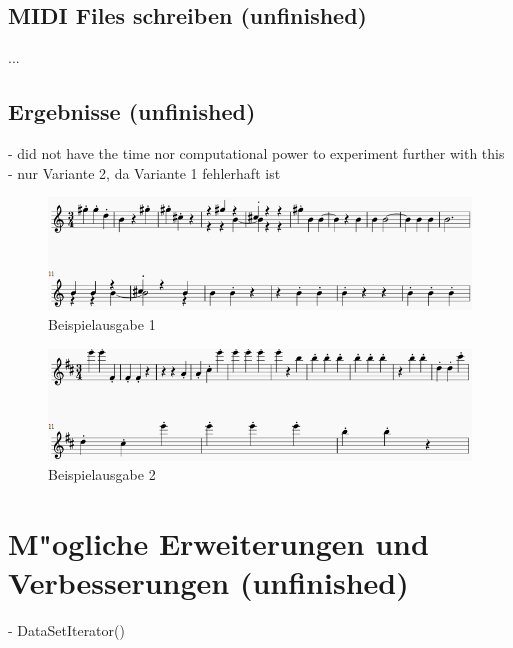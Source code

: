 {\subsection{MIDI Files schreiben (unfinished)}
...

\subsection{Ergebnisse (unfinished)}
- did not have the time nor computational power to experiment further with this
- nur Variante 2, da Variante 1 fehlerhaft ist

\renewcommand{\figurename}{Abb.}
\begin{figure}[htp]
\centering
\includegraphics[width=1\textwidth]{pictures/sampleMidi1.png}
\caption[Beispielausgabe 1]{Beispielausgabe 1}
\end{figure}

\renewcommand{\figurename}{Abb.}
\begin{figure}[htp]
\centering
\includegraphics[width=1\textwidth]{pictures/sampleMidi2.png}
\caption[Beispielausgabe 2]{Beispielausgabe 2}
\end{figure}

\section{M"ogliche Erweiterungen und Verbesserungen (unfinished)}
- DataSetIterator()
} %